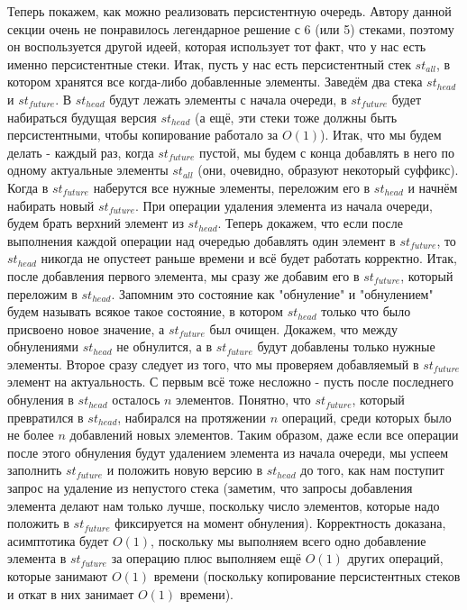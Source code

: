 Теперь покажем, как можно реализовать персистентную очередь. Автору данной секции очень не понравилось легендарное решение с 6 (или 5) стеками, поэтому он воспользуется другой идеей, которая использует тот факт, что у нас есть именно персистентные стеки. Итак, пусть у нас есть персистентный стек $st_{all}$, в котором хранятся все когда-либо добавленные элементы. Заведём два стека $st_{head}$ и $st_{future}$. В $st_{head}$ будут лежать элементы с начала очереди, в $st_{future}$ будет набираться будущая версия $st_{head}$ (а ещё, эти стеки тоже должны быть персистентными, чтобы копирование работало за $O(1)$). Итак, что мы будем делать - каждый раз, когда $st_{future}$ пустой, мы будем с конца добавлять в него по одному актуальные элементы $st_{all}$ (они, очевидно, образуют некоторый суффикс). Когда в $st_{future}$ наберутся все нужные элементы, переложим его в $st_{head}$ и начнём набирать новый $st_{future}$. При операции удаления элемента из начала очереди, будем брать верхний элемент из $st_{head}$. Теперь докажем, что если после выполнения каждой операции над очередью добавлять один элемент в $st_{future}$, то $st_{head}$ никогда не опустеет раньше времени и всё будет работать корректно. Итак, после добавления первого элемента, мы сразу же добавим его в $st_{future}$, который переложим в $st_{head}$. Запомним это состояние как "обнуление" и "обнулением" будем называть всякое такое состояние, в котором $st_{head}$ только что было присвоено новое значение, а $st_{future}$ был очищен. Докажем, что между обнулениями $st_{head}$ не обнулится, а в $st_{future}$ будут добавлены только нужные элементы. Второе сразу следует из того, что мы проверяем добавляемый в $st_{future}$ элемент на актуальность. С первым всё тоже несложно - пусть после последнего обнуления в $st_{head}$ осталось $n$ элементов. Понятно, что $st_{future}$, который превратился в $st_{head}$, набирался на протяжении $n$ операций, среди которых было не более $n$ добавлений новых элементов. Таким образом, даже если все операции после этого обнуления будут удалением элемента из начала очереди, мы успеем заполнить $st_{future}$ и положить новую версию в $st_{head}$ до того, как нам поступит запрос на удаление из непустого стека (заметим, что запросы добавления элемента делают нам только лучше, поскольку число элементов, которые надо положить в $st_{future}$ фиксируется на момент обнуления). Корректность доказана, асимптотика будет $O(1)$, поскольку мы выполняем всего одно добавление элемента в $st_{future}$ за операцию плюс выполняем ещё $O(1)$ других операций, которые занимают $O(1)$ времени (поскольку копирование персистентных стеков и откат в них занимает $O(1)$ времени).
